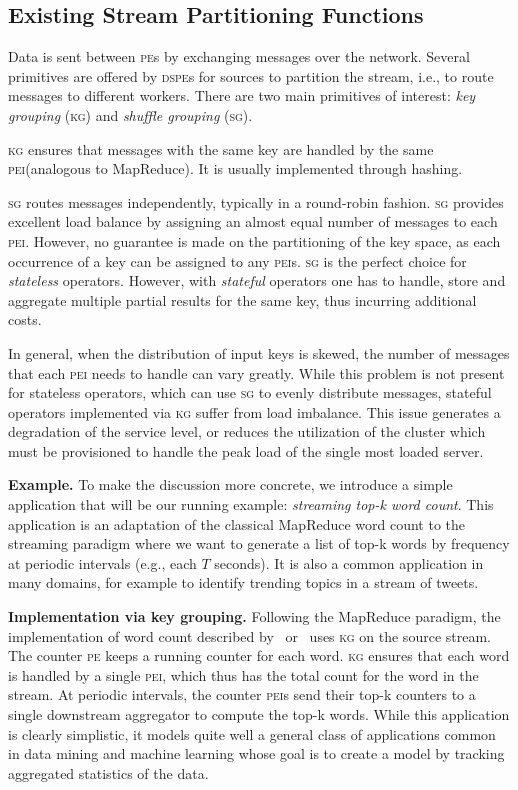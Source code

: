 \documentclass[10pt,conference,letterpaper]{IEEEtran}
\newcommand{\spara}[1]{\smallskip\noindent\textbf{#1}}
\newcommand{\pei}{\textsc{pei}\xspace}
\newcommand{\peis}{{\pei}s\xspace}
\newcommand{\pe}{\textsc{pe}\xspace}
\newcommand{\pes}{{\pe}s\xspace}
\newcommand{\dspe}{\textsc{dspe}\xspace}
\newcommand{\dspes}{{\dspe}s\xspace}
\newcommand{\kg}{\textsc{kg}\xspace}
\newcommand{\sg}{\textsc{sg}\xspace}
\begin{document}
\subsection{Existing Stream Partitioning Functions}
\label{sec:existing-partitioning}
Data is sent between \pes by exchanging messages over the network.
Several primitives are offered by \dspes for sources to partition the stream, i.e., to route messages to different workers.
There are two main primitives of interest: \emph{key grouping} (\kg) and \emph{shuffle grouping} (\sg).


\kg ensures that messages with the same key are handled by the same \pei (analogous to MapReduce).
It is usually implemented through hashing. 

\sg routes messages independently, typically in a round-robin fashion.
\sg provides excellent load balance by assigning an almost equal number of messages to each \pei.
However, no guarantee is made on the partitioning of the key space, as each occurrence of a key can be assigned to any \peis.
\sg is the perfect choice for \emph{stateless} operators.
However, with \emph{stateful} operators one has to handle, store and aggregate multiple partial results for the same key, thus incurring additional costs. 




In general, when the distribution of input keys is skewed, the number of messages that each \pei needs to handle can vary greatly.
While this problem is not present for stateless operators, which can use \sg to evenly distribute messages, stateful operators implemented via \kg suffer from load imbalance.
This issue generates a degradation of the service level, or reduces the utilization of the cluster which must be provisioned to handle the peak load of the single most loaded server.




\spara{Example.}
To make the discussion more concrete, we introduce a simple application that will be our running example: \emph{streaming top-k word count}.
This application is an adaptation of the classical MapReduce word count to the streaming paradigm where we want to generate a list of top-k words by frequency at periodic intervals (e.g., each $T$ seconds).
It is also a common application in many domains, for example to identify trending topics in a stream of tweets.

\spara{Implementation via key grouping.} Following the MapReduce paradigm, the implementation of word count described by~\citet{neumeyer2010s4} or~\citet{noll2013rolling} uses \kg on the source stream.
The counter \pe keeps a running counter for each word.
\kg ensures that each word is handled by a single \pei, which thus has the total count for the word in the stream.
At periodic intervals, the counter \peis send their top-k counters to a single downstream aggregator to compute the top-k words.
While this application is clearly simplistic, it models quite well a general class of applications common in data mining and machine learning whose goal is to create a model by tracking aggregated statistics of the data.
\end{document}
